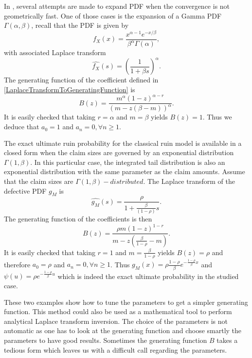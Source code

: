 \begin{Ex}\label{GammaPDFExpansion}
In \citet{AbChWh95}, several attempts are made to expand PDF when the convergence is not geometrically fast. One of those cases is the expansion of a Gamma PDF $\Gamma(\alpha,\beta)$, recall that the PDF is given by 
\begin{equation}
f_{X}(x)=\frac{x^{\alpha-1}e^{-x/\beta}}{\beta^{\alpha}\Gamma(\alpha)},
\end{equation}
with associated Laplace transform
\begin{equation}
\widehat{f_{X}}(s)=\left(\frac{1}{1+\beta s}\right)^{\alpha}.
\end{equation}
The generating function of the coefficient defined in \eqref{LaplaceTransformToGeneratingFunction} is
\begin{equation}
B(z)=\frac{m^{\alpha}(1-z)^{\alpha-r}}{(m-z(\beta-m))^{\alpha}}.
\end{equation} 
It is easily checked that taking $r=\alpha$ and $m=\beta$ yields $B(z)=1$. Thus we deduce that $a_{0}=1$ and $a_{n}=0,\forall n\geq1$.  
\end{Ex}
\begin{Ex}\label{UltimateRuinProbabilityExponentialCaseExample}
The exact ultimate ruin probability for the classical ruin model is available in a closed form when the claim sizes are governed by an exponential distribution $\Gamma(1,\beta)$. In this particular case, the integrated tail distribution is also an exponential distribution with the same parameter as the claim amounts. Assume that the claim sizes are $\Gamma(1,\beta)-distributed$. The Laplace transform of the defective PDF $g_{M}$ is 
\begin{equation*}
\widehat{g_{M}}(s)=\frac{\rho}{1+\frac{\beta}{(1-\rho)}s}.
\end{equation*}
The generating function of the coefficients is then
\begin{equation*}
B(z)=\frac{\rho m(1-z)^{1-r}}{m-z\left(\frac{\beta}{1-\rho}-m\right)}.
\end{equation*}
It is easily checked that taking $r=1$ and $m=\frac{\beta}{1-\rho}$ yields $B(z)=\rho$ and therefore $a_{0}=\rho$ and $a_{n}=0,\forall n\geq1$. Thus $g_{M}(x)=\rho\frac{1-\rho}{\beta}e^{-\frac{1-\rho}{\beta}x}$ and $\psi(u)=\rho e^{-\frac{1-\rho}{\beta}u}$ which is indeed the exact ultimate probability in the studied case.
\end{Ex}
These two examples show how to tune the parameters to get a simpler generating function. This method could also be used as a mathematical tool to perform analytical Laplace transform inversion. The choice of the parameters is not automatic as one has to look at the generating function and choose smartly the parameters to have good results. Sometimes the generating function $B$ takes a tedious form which leaves us with a difficult call regarding the parameters. 
